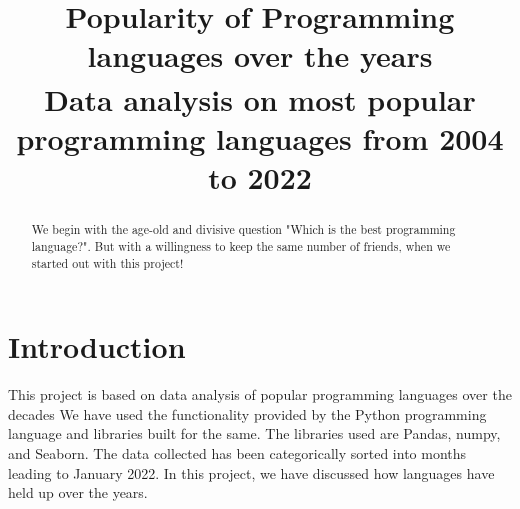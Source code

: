 \documentclass[conference]{IEEEtran}
\begin{document}
\title{Popularity of Programming languages over the years\\
{\footnotesize \textsuperscript{}Data analysis on most popular programming languages from 2004 to 2022}}


\author{
\and
{}
\and
{}
\and
{}
\and
{}
}

\maketitle

\begin{abstract}
We begin with the age-old and divisive question "Which is the best programming language?". But with a willingness to keep the same number of friends, when we started out with this project!
\end{abstract}

\section{Introduction}
This project is based on data analysis of popular programming languages over the decades
We have used the functionality provided by the Python programming language and libraries built for the same. The libraries used are Pandas, numpy, and Seaborn. The data collected has been categorically sorted into months leading to January 2022. In this project, we have discussed how languages have held up over the years.
\end{document}
